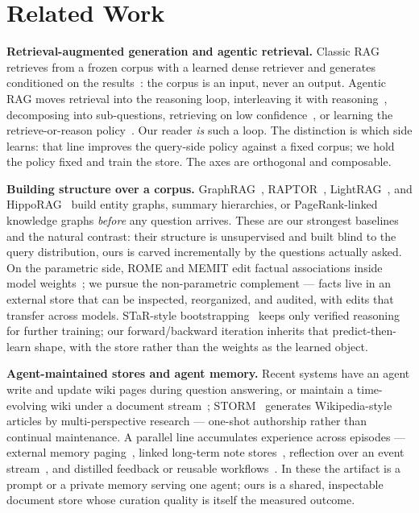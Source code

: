 \documentclass[conference]{IEEEtran}
\begin{document}
\section{Related Work}
\textbf{Retrieval-augmented generation and agentic retrieval.} Classic RAG
retrieves from a frozen corpus with a learned dense retriever and generates
conditioned on the results~\cite{rag-lewis,dpr,realm,fid}: the corpus is an
input, never an output. Agentic RAG moves retrieval into the reasoning loop, interleaving it with
reasoning~\cite{react,ircot}, decomposing into sub-questions, retrieving on
low confidence~\cite{selfrag}, or learning the retrieve-or-reason
policy~\cite{searchr1,agentic-rag-survey}. Our reader \emph{is} such
a loop. The distinction is which side learns: that line improves the
query-side policy against a fixed corpus; we hold the policy fixed and train
the store. The axes are orthogonal and composable.

\textbf{Building structure over a corpus.} GraphRAG~\cite{graphrag},
RAPTOR~\cite{raptor}, LightRAG~\cite{lightrag}, and
HippoRAG~\cite{hipporag,hipporag2} build entity graphs, summary hierarchies,
or PageRank-linked knowledge graphs \emph{before} any question arrives.
These are our strongest baselines and the natural contrast: their structure
is unsupervised and built blind to the query distribution, ours is carved
incrementally by the questions actually asked. On the parametric side, ROME
and MEMIT edit factual associations inside model weights~\cite{rome,memit};
we pursue the non-parametric complement --- facts live in an external store
that can be inspected, reorganized, and audited, with edits that transfer
across models. STaR-style bootstrapping~\cite{star} keeps only verified
reasoning for further training; our forward/backward iteration inherits that
predict-then-learn shape, with the store rather than the weights as the
learned object.

\textbf{Agent-maintained stores and agent memory.} Recent systems have an agent
write and update wiki pages during question answering, or maintain a
time-evolving wiki under a document
stream~\cite{llmwiki-rar,llmwiki-stream,karpathy-llmwiki};
STORM~\cite{storm} generates Wikipedia-style articles by multi-perspective
research --- one-shot authorship rather than continual maintenance. A parallel line accumulates experience
across episodes --- external memory paging~\cite{memgpt}, linked long-term
note stores~\cite{mem0,amem}, reflection over an event
stream~\cite{generative-agents}, and distilled feedback or reusable
workflows~\cite{reflexion,awm,ace}. In these the
artifact is a prompt or a private memory serving one agent; ours is a
shared, inspectable document store whose curation quality is itself the
measured outcome.
\end{document}
